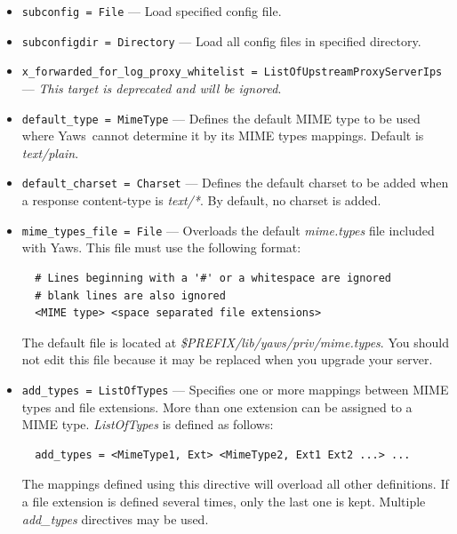 \documentclass[11pt,oneside,english]{book}
\newcommand{\Yaws}            %
        {{\sc Yaws}}
\begin{document}
\begin{itemize}
\item        \verb+subconfig = File+ ---
              Load specified config file.

\item        \verb+subconfigdir = Directory+ ---
              Load all config files in specified directory.

\item        \verb+x_forwarded_for_log_proxy_whitelist = ListOfUpstreamProxyServerIps+ ---
              \textit{This target is deprecated and will be ignored}.

\item        \verb+default_type = MimeType+ ---
              Defines the default MIME type to be used where \Yaws\ cannot
              determine it by its MIME types mappings. Default is
              \textit{text/plain}.

\item        \verb+default_charset = Charset+ ---
              Defines the default charset to be added when a response
              content-type is \textit{text/*}. By default, no charset is added.

\item        \verb+mime_types_file = File+ ---
              Overloads the default \textit{mime.types} file included with
              \Yaws{}. This file must use the following format:
\begin{verbatim}
  # Lines beginning with a '#' or a whitespace are ignored
  # blank lines are also ignored
  <MIME type> <space separated file extensions>
\end{verbatim}
              The default file is located at
              \textit{\${PREFIX}/lib/yaws/priv/mime.types}. You should not edit
              this file because it may be replaced when you upgrade your server.

\item        \verb+add_types = ListOfTypes+ ---
              Specifies one or more mappings between MIME types and file
              extensions. More than one extension can be assigned to a MIME
              type. \textit{ListOfTypes} is defined as follows:
\begin{verbatim}
  add_types = <MimeType1, Ext> <MimeType2, Ext1 Ext2 ...> ...
\end{verbatim}
              The mappings defined using this directive will overload all other
              definitions. If a file extension is defined several times, only
              the last one is kept. Multiple \textit{add\_types} directives may
              be used.


\end{itemize}
\end{document}
